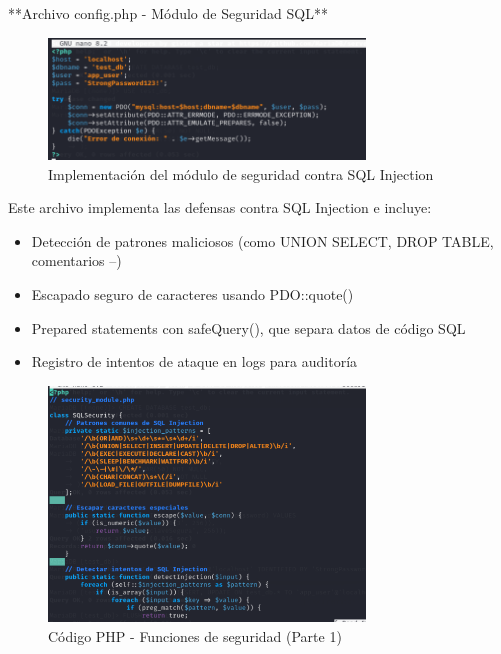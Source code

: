\documentclass[12pt,a4paper]{article}
\begin{document}
**Archivo config.php - Módulo de Seguridad SQL**

\begin{figure}[H]
	\centering
	\includegraphics[width=0.75\textwidth]{./assets/img4.png}
	\caption{Implementación del módulo de seguridad contra SQL Injection}
	\label{fig:config-seguridad}
\end{figure}

Este archivo implementa las defensas contra SQL Injection e incluye:

\begin{itemize}
	\item Detección de patrones maliciosos (como UNION SELECT, DROP TABLE, comentarios
	      --)
	\item Escapado seguro de caracteres usando PDO::quote()
	\item Prepared statements con safeQuery(), que separa datos de código SQL
	\item Registro de intentos de ataque en logs para auditoría
\end{itemize}

\begin{figure}[H]
	\centering
	\includegraphics[width=0.75\textwidth]{./assets/img5.png}
	\caption{Código PHP - Funciones de seguridad (Parte 1)}
	\label{fig:php-seguridad-1}
\end{figure}
\end{document}
